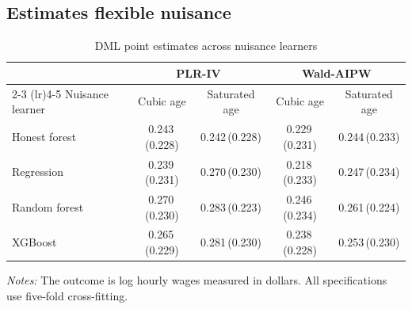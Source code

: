 \documentclass[12pt, a4paper, oneside]{article}
\theoremstyle{plain}
\theoremstyle{definition}
\begin{document}
\subsection{Estimates flexible nuisance}
\begin{table}[H]
\centering
\caption{DML point estimates across nuisance learners}
\label{tab:vietnam_dml_learners}
\small
\begin{threeparttable}
\begin{tabular}{@{}lcccc@{}}
\toprule
& \multicolumn{2}{c}{PLR-IV}
& \multicolumn{2}{c}{Wald-AIPW} \\
\cmidrule(lr){2-3}
\cmidrule(lr){4-5}
Nuisance learner
& Cubic age
& Saturated age
& Cubic age
& Saturated age \\
\midrule

Honest forest
& 0.243\,(0.228)
& 0.242\,(0.228)
& 0.229\,(0.231)
& 0.244\,(0.233) \\

Regression
& 0.239\,(0.231)
& 0.270\,(0.230)
& 0.218\,(0.233)
& 0.247\,(0.234) \\

Random forest
& 0.270\,(0.230)
& 0.283\,(0.223)
& 0.246\,(0.234)
& 0.261\,(0.224) \\

XGBoost
& 0.265\,(0.229)
& 0.281\,(0.230)
& 0.238\,(0.228)
& 0.253\,(0.230) \\

\bottomrule
\end{tabular}

\begin{tablenotes}
\footnotesize
\item \textit{Notes:} The outcome is log hourly wages measured in
dollars. All specifications use five-fold cross-fitting. 
\end{tablenotes}
\end{threeparttable}
\end{table}
\end{document}
